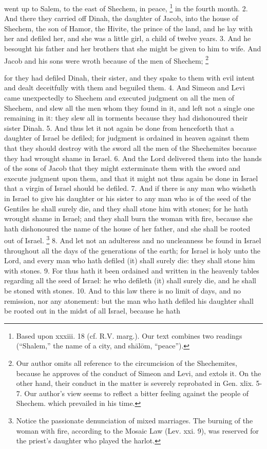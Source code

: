 went up to Salem, to the east of Shechem, in peace, \footnote{Based upon xxxiii. 18 (cf. R.V. marg.). Our text combines two readings (``Shalem,'' the name of a city, and shālōm, ``peace'').} in the fourth month. 2. And there they carried off Dinah, the daughter of Jacob, into the house of Shechem, the son of Hamor, the Hivite, the prince of the land, and he lay with her and defiled her, and she was a little girl, a child of twelve years. 3. And he besought his father and her brothers that she might be given to him to wife. And Jacob and his sons were wroth because of the men of Shechem; \footnote{Our author omits all reference to the circumcision of the Shechemites, because he approves of the conduct of Simeon and Levi, and extols it. On the other hand, their conduct in the matter is severely reprobated in Gen. xlix. 5-7. Our author's view seems to reflect a bitter feeling against the people of Shechem. which prevailed in his time.}

for they had defiled Dinah, their sister, and they spake to them with evil intent and dealt deceitfully with them and beguiled them. 4. And Simeon and Levi came unexpectedly to Shechem and executed judgment on all the men of Shechem, and slew all the men whom they found in it, and left not a single one remaining in it: they slew all in torments because they had dishonoured their sister Dinah. 5. And thus let it not again be done from henceforth that a daughter of Israel be defiled; for judgment is ordained in heaven against them that they should destroy with the sword all the men of the Shechemites because they had wrought shame in Israel. 6. And the Lord delivered them into the hands of the sons of Jacob that they might exterminate them with the sword and execute judgment upon them, and that it might not thus again be done in Israel that a virgin of Israel should be defiled. 7. And if there is any man who wisheth in Israel to give his daughter or his sister to any man who is of the seed of the Gentiles he shall surely die, and they shall stone him with stones; for he hath wrought shame in Israel; and they shall burn the woman with fire, because she hath dishonoured the name of the house of her father, and she shall be rooted out of Israel. \footnote{Notice the passionate denunciation of mixed marriages. The burning of the woman with fire, according to the Mosaic Law (Lev. xxi. 9), was reserved for the priest's daughter who played the harlot.} 8. And let not an adulteress and no uncleanness be found in Israel throughout all the days of the generations of the earth; for Israel is holy unto the Lord, and every man who hath defiled (it) shall surely die: they shall stone him with stones. 9. For thus hath it been ordained and written in the heavenly tables regarding all the seed of Israel: he who defileth (it) shall surely die, and he shall be stoned with stones. 10. And to this law there is no limit of days, and no remission, nor any atonement: but the man who hath defiled his daughter shall be rooted out in the midst of all Israel, because he hath


